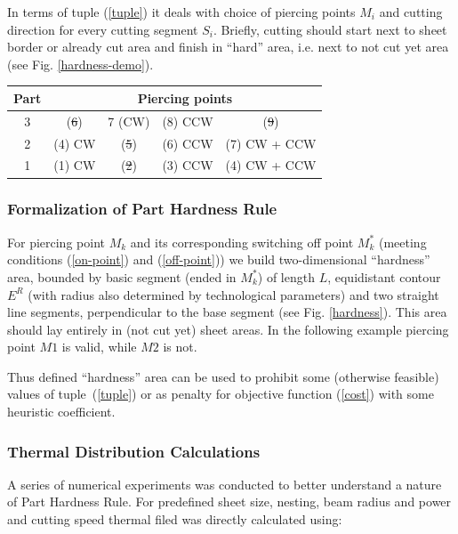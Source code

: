 \documentclass{../download/tPRS2e}
\begin{document}
In terms of tuple (\ref{tuple}) it deals with choice of piercing points $M_i$
and cutting direction for every cutting segment $S_i$.
Briefly, cutting should start next to sheet border or already cut area and finish in “hard” area,
i.e. next to not cut yet area (see Fig. \ref{hardness-demo}).

\begin{center}
\begin{tabular}{ c | c | c | c | c}
  \multicolumn{1}{c|}{Part} & \multicolumn{4}{c}{Piercing points} \\ \hline
  3 & (\st{6}) & 7 (CW) & (8) CCW & (\st{9}) \\
  2 & (4) CW & (\st{5}) & (6) CCW & (7) CW +  CCW \\
  1 & (1) CW & (\st{2}) & (3) CCW & (4) CW +  CCW \\
\end{tabular}
\end{center}

\subsubsection{Formalization of Part Hardness Rule}

For piercing point $M_k$ and its corresponding switching off point $M^*_k$
(meeting conditions (\ref{on-point}) and (\ref{off-point}))
we build two-dimensional ``hardness'' area,
bounded by basic segment (ended in  $M^*_k$) of length $L$,
equidistant contour $E^R$  (with radius also determined by technological parameters)
and two straight line segments, perpendicular to the base segment (see Fig. \ref{hardness}).
This area should lay entirely in (not cut yet) sheet areas.
In the following example piercing point $M1$ is valid, while $M2$ is not.

Thus defined ``hardness'' area can be used to prohibit some (otherwise feasible) values of tuple~(\ref{tuple})
or as penalty for objective function (\ref{cost}) with some heuristic coefficient.

\subsubsection{Thermal Distribution Calculations}

A series of numerical experiments was conducted to better understand a nature of Part Hardness Rule.
For predefined sheet size, nesting, beam radius and power and cutting speed thermal filed was directly calculated using:
\end{document}
